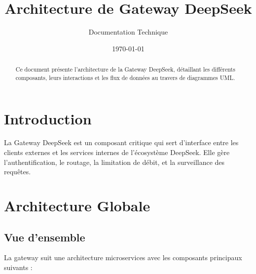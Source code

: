 \documentclass[12pt,a4paper]{article}
\title{Architecture de Gateway DeepSeek}
\author{Documentation Technique}
\date{\today}
\begin{document}
\maketitle

\begin{abstract}
Ce document présente l'architecture de la Gateway DeepSeek, détaillant les différents composants, leurs interactions et les flux de données au travers de diagrammes UML.
\end{abstract}

\tableofcontents

\section{Introduction}
\label{sec:introduction}

La Gateway DeepSeek est un composant critique qui sert d'interface entre les clients externes et les services internes de l'écosystème DeepSeek. Elle gère l'authentification, le routage, la limitation de débit, et la surveillance des requêtes.

\section{Architecture Globale}
\label{sec:architecture-globale}

\subsection{Vue d'ensemble}
La gateway suit une architecture microservices avec les composants principaux suivants :

\begin{center}
\end{center}
\end{document}
